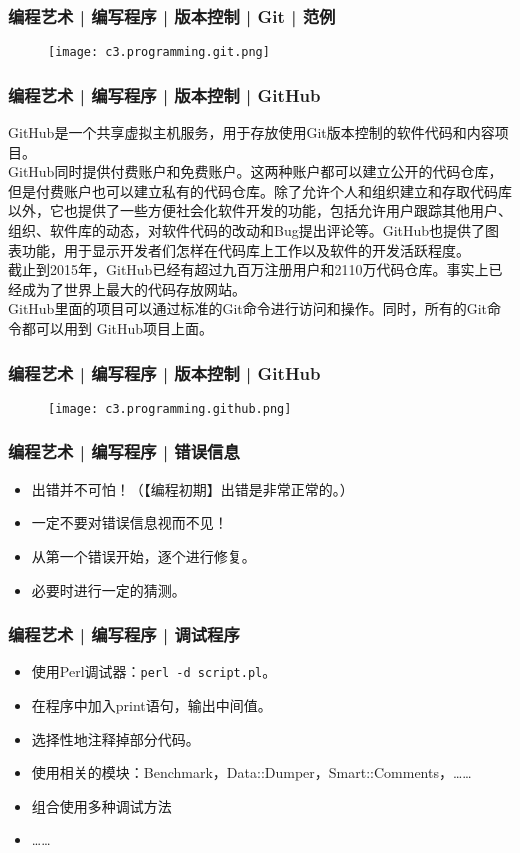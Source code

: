\begin{frame}
  \frametitle{编程艺术 | 编写程序 | 版本控制 | Git | \alert{范例}}
  \begin{figure}
    \centering
    \texttt{[image: c3.programming.git.png]}
  \end{figure}
\end{frame}

\begin{frame}
  \frametitle{编程艺术 | 编写程序 | 版本控制 | GitHub}
  GitHub是一个共享虚拟主机服务，用于存放使用Git版本控制的软件代码和内容项目。\\
  \vspace{1em}
  GitHub同时提供付费账户和免费账户。这两种账户都可以建立公开的代码仓库，但是付费账户也可以建立私有的代码仓库。除了允许个人和组织建立和存取代码库以外，它也提供了一些方便社会化软件开发的功能，包括允许用户跟踪其他用户、组织、软件库的动态，对软件代码的改动和Bug提出评论等。GitHub也提供了图表功能，用于显示开发者们怎样在代码库上工作以及软件的开发活跃程度。\\
  \vspace{1em}
  截止到2015年，GitHub已经有超过九百万注册用户和2110万代码仓库。事实上已经成为了世界上最大的代码存放网站。\\
  \vspace{1em}
  GitHub里面的项目可以通过标准的Git命令进行访问和操作。同时，所有的Git命令都可以用到 GitHub项目上面。
\end{frame}

\begin{frame}
  \frametitle{编程艺术 | 编写程序 | 版本控制 | GitHub}
  \begin{figure}
    \centering
    \texttt{[image: c3.programming.github.png]}
  \end{figure}
\end{frame}

\begin{frame}
  \frametitle{编程艺术 | 编写程序 | 错误信息}
  \begin{itemize}
    \item 出错并不可怕！（【编程初期】出错是非常正常的。）
    \item 一定不要对错误信息视而不见！
    \item 从第一个错误开始，逐个进行修复。
    \item 必要时进行一定的猜测。
  \end{itemize}
\end{frame}

\begin{frame}[fragile]
  \frametitle{编程艺术 | 编写程序 | \alert{调试程序}}
  \begin{itemize}
    \item 使用Perl调试器：\verb|perl -d script.pl|。
    \item 在程序中加入print语句，输出中间值。
    \item 选择性地注释掉部分代码。
    \item 使用相关的模块：Benchmark，Data::Dumper，Smart::Comments，……
    \item 组合使用多种调试方法
    \item ……
  \end{itemize}
\end{frame}

